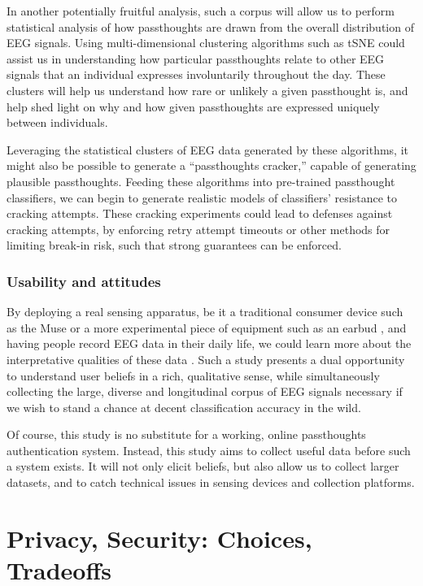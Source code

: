 \documentclass[sigconf]{acmart}
\begin{document}
In another potentially fruitful analysis, such a corpus will allow us to perform statistical analysis of how passthoughts are drawn from the overall distribution of EEG signals. 
Using multi-dimensional clustering algorithms such as tSNE \cite{VanDerMaaten2008} 
could assist us in understanding how particular passthoughts relate to other EEG signals that an individual expresses involuntarily throughout the day. 
These clusters will help us understand how rare or unlikely a given passthought is, and help shed light on why and how given passthoughts are expressed uniquely between individuals.

Leveraging the statistical clusters of EEG data generated by these algorithms, it might also be possible to generate a ``passthoughts cracker,'' capable of generating plausible passthoughts. 
Feeding these algorithms into pre-trained passthought classifiers, we can begin to generate realistic models of classifiers' resistance to cracking attempts. 
These cracking experiments could lead to defenses against cracking attempts, by enforcing retry attempt timeouts or other methods for limiting break-in risk, such that strong guarantees can be enforced.

\subsubsection{Usability and attitudes}
\label{sec:orgd8e2296}

By deploying a real sensing apparatus, be it a traditional consumer device such as the Muse \cite{Mihajlovic2015} 
or a more experimental piece of equipment such as an earbud \cite{UnitedSciences}, 
and having people record EEG data in their daily life, we could learn more about the interpretative qualities of these data  \cite{NafusDawn;Sherman2014}.
Such a study presents a dual opportunity to understand user beliefs in a rich, qualitative sense, while simultaneously collecting the large, diverse and longitudinal corpus of EEG signals necessary if we wish to stand a chance at decent classification accuracy in the wild.

Of course, this study is no substitute for a working, online passthoughts authentication system.
Instead, this study aims to collect useful data before such a system exists.
It will not only elicit beliefs, 
but also allow us to collect larger datasets, 
and to catch technical issues in sensing devices and collection platforms.

\section{Privacy, Security: Choices, Tradeoffs}
\label{sec:orgd1ac1ca}
\end{document}
